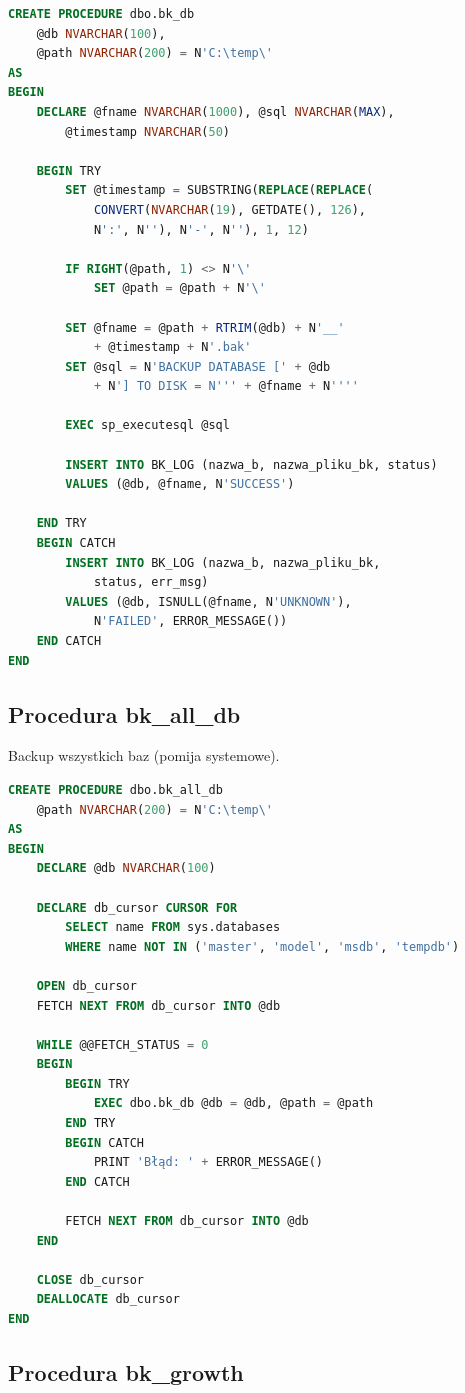 \documentclass[a4paper,11pt]{article}
\begin{document}
	\begin{lstlisting}[language=SQL]
CREATE PROCEDURE dbo.bk_db
	@db NVARCHAR(100),
	@path NVARCHAR(200) = N'C:\temp\'
AS
BEGIN
	DECLARE @fname NVARCHAR(1000), @sql NVARCHAR(MAX),
		@timestamp NVARCHAR(50)
	
	BEGIN TRY
		SET @timestamp = SUBSTRING(REPLACE(REPLACE(
			CONVERT(NVARCHAR(19), GETDATE(), 126), 
			N':', N''), N'-', N''), 1, 12)
		
		IF RIGHT(@path, 1) <> N'\'
			SET @path = @path + N'\'
		
		SET @fname = @path + RTRIM(@db) + N'__' 
			+ @timestamp + N'.bak'
		SET @sql = N'BACKUP DATABASE [' + @db 
			+ N'] TO DISK = N''' + @fname + N''''
		
		EXEC sp_executesql @sql
		
		INSERT INTO BK_LOG (nazwa_b, nazwa_pliku_bk, status)
		VALUES (@db, @fname, N'SUCCESS')
		
	END TRY
	BEGIN CATCH
		INSERT INTO BK_LOG (nazwa_b, nazwa_pliku_bk, 
			status, err_msg)
		VALUES (@db, ISNULL(@fname, N'UNKNOWN'), 
			N'FAILED', ERROR_MESSAGE())
	END CATCH
END
	\end{lstlisting}
	
	\subsection{Procedura bk\_all\_db}
	
	Backup wszystkich baz (pomija systemowe).
	
	\begin{lstlisting}[language=SQL]
CREATE PROCEDURE dbo.bk_all_db
	@path NVARCHAR(200) = N'C:\temp\'
AS
BEGIN
	DECLARE @db NVARCHAR(100)
	
	DECLARE db_cursor CURSOR FOR
		SELECT name FROM sys.databases 
		WHERE name NOT IN ('master', 'model', 'msdb', 'tempdb')
	
	OPEN db_cursor
	FETCH NEXT FROM db_cursor INTO @db
	
	WHILE @@FETCH_STATUS = 0
	BEGIN
		BEGIN TRY
			EXEC dbo.bk_db @db = @db, @path = @path
		END TRY
		BEGIN CATCH
			PRINT 'Błąd: ' + ERROR_MESSAGE()
		END CATCH
		
		FETCH NEXT FROM db_cursor INTO @db
	END
	
	CLOSE db_cursor
	DEALLOCATE db_cursor
END
	\end{lstlisting}
	
	\subsection{Procedura bk\_growth}
	
\end{document}
